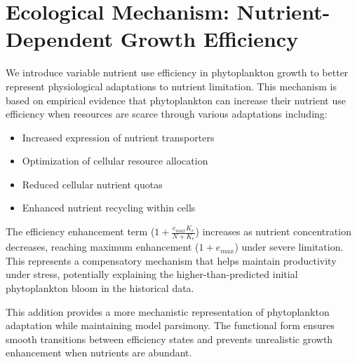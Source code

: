 \section{Ecological Mechanism: Nutrient-Dependent Growth Efficiency}

We introduce variable nutrient use efficiency in phytoplankton growth to better represent physiological adaptations to nutrient limitation. This mechanism is based on empirical evidence that phytoplankton can increase their nutrient use efficiency when resources are scarce through various adaptations including:

\begin{itemize}
\item Increased expression of nutrient transporters
\item Optimization of cellular resource allocation
\item Reduced cellular nutrient quotas
\item Enhanced nutrient recycling within cells
\end{itemize}

The efficiency enhancement term ($1 + \frac{e_{max} K_e}{N + K_e}$) increases as nutrient concentration decreases, reaching maximum enhancement ($1 + e_{max}$) under severe limitation. This represents a compensatory mechanism that helps maintain productivity under stress, potentially explaining the higher-than-predicted initial phytoplankton bloom in the historical data.

This addition provides a more mechanistic representation of phytoplankton adaptation while maintaining model parsimony. The functional form ensures smooth transitions between efficiency states and prevents unrealistic growth enhancement when nutrients are abundant.
